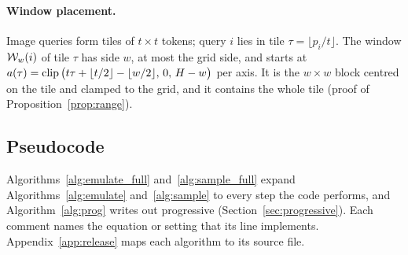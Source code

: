 \paragraph{Window placement.} Image queries form tiles of $t\times t$ tokens; query $i$ lies in tile $\tau=\lfloor p_i/t\rfloor$. The window $\mathcal{W}_w(i)$ of tile $\tau$ has side $w$, at most the grid side, and starts at $a(\tau)=\operatorname{clip}\big(t\tau+\lfloor t/2\rfloor-\lfloor w/2\rfloor,\,0,\,H-w\big)$ per axis. It is the $w\times w$ block centred on the tile and clamped to the grid, and it contains the whole tile (proof of Proposition~\ref{prop:range}).

\ifshortversion\else
\subsection{Pseudocode}
\label{app:code}

Algorithms~\ref{alg:emulate_full} and~\ref{alg:sample_full} expand Algorithms~\ref{alg:emulate} and~\ref{alg:sample} to every step the code performs, and Algorithm~\ref{alg:prog} writes out progressive \sca{} (Section~\ref{sec:progressive}). Each comment names the equation or setting that its line implements. Appendix~\ref{app:release} maps each algorithm to its source file.

